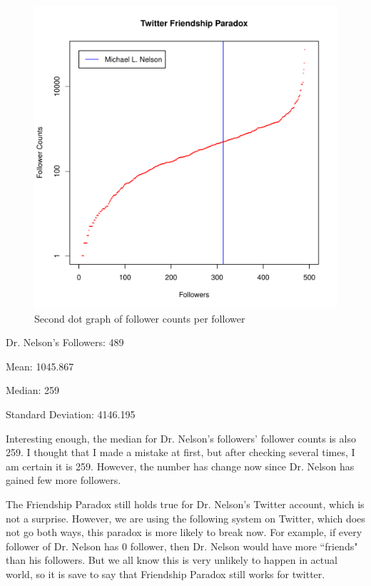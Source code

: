 \documentclass[12pt]{article}
\begin{document}
\begin{figure}[h]
\centering
\includegraphics[width=5in]{TwitterFollowerslg.pdf}
\caption{Second dot graph of follower counts per follower}
\end{figure}

\noindent
Dr. Nelson's Followers: 489

\noindent
Mean: 1045.867

\noindent
Median: 259

\noindent
Standard Deviation: 4146.195

Interesting enough, the median for Dr. Nelson's followers' follower counts is also 259. I thought that I made a mistake at first, but after checking several times, I am certain it is 259. However, the number has change now since Dr. Nelson has gained few more followers. 

The Friendship Paradox still holds true for Dr. Nelson's Twitter account, which is not a surprise. However, we are using the following system on Twitter, which does not go both ways, this paradox is more likely to break now. For example, if every follower of Dr. Nelson has 0 follower, then Dr. Nelson would have more ``friends" than his followers. But we all know this is very unlikely to happen in actual world, so it is save to say that Friendship Paradox still works for twitter.
\end{document}
